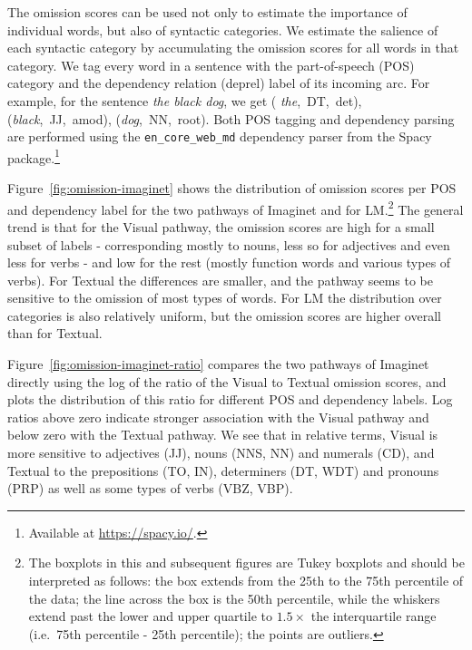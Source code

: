 The omission scores can be used not only to
estimate the importance of individual words, but also of syntactic
categories. We estimate the salience of each syntactic category by
accumulating the omission scores for all words in that category. We
tag every word in a sentence with the part-of-speech (POS) category
and the dependency relation (deprel) label of its incoming arc. For
example, for the sentence \emph{the black dog}, we get ({\it
  the},~DT,~det), 
({\it black},~JJ,~amod), ({\it dog},~NN,~root). 
Both POS tagging and dependency parsing are performed 
using the  \verb+en_core_web_md+ dependency parser from the Spacy package.\footnote{Available at
  \url{https://spacy.io/}.} 


Figure~\ref{fig:omission-imaginet} shows the distribution of omission
scores per POS and dependency label for the two pathways of {\sc
  Imaginet} and for {\sc LM}.\footnote{The boxplots in this and
  subsequent figures are Tukey boxplots and should be interpreted as follows: the box extends
from the 25th to the 75th percentile of the data; the line across the
box is the 50th percentile, while the whiskers extend past the lower
and upper quartile to $1.5\times$
the interquartile range (i.e.\ 75th percentile - 25th percentile); the
points are outliers.}  The general trend is that for the {\sc
  Visual} pathway, the omission scores are high for a small subset of
labels - corresponding mostly to nouns, less so for adjectives and
even less for verbs - and low for the rest (mostly function words and
various types of verbs). For {\sc Textual} the differences
are \label{edit:textualomission} smaller, and the pathway seems to be
sensitive to the omission of most types of words.  For {\sc LM} the
distribution over categories is also relatively uniform, but the omission scores are higher
overall than for {\sc Textual}.

Figure~\ref{fig:omission-imaginet-ratio} compares the two pathways of
{\sc Imaginet} directly using the log of the ratio of the {\sc Visual}
to {\sc Textual} omission scores, and plots the distribution of this
ratio for different POS and dependency labels.  Log ratios above zero
indicate stronger association with the {\sc Visual} pathway and below
zero with the {\sc Textual} pathway. We see that in relative terms,
{\sc Visual} is more sensitive to adjectives (JJ), nouns (NNS, NN) and
numerals (CD), and {\sc Textual} to the prepositions (TO, IN),
determiners (DT, WDT) and pronouns (PRP) as well as some types of
verbs (VBZ, VBP).

